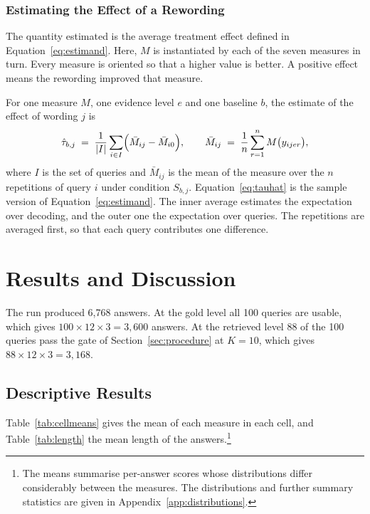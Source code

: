 \documentclass[12pt,a4paper,oneside]{scrreprt}
\begin{document}
\subsection{Estimating the Effect of a Rewording}
\label{sec:analysis}

The quantity estimated is the average treatment effect defined in Equation~\eqref{eq:estimand}. Here, $M$ is instantiated by each of the seven measures in turn. Every measure is oriented so that a higher value is better. A positive effect means the rewording improved that measure.

For one measure $M$, one evidence level $e$ and one baseline $b$, the estimate of the effect of wording $j$ is
\begin{equation}
\label{eq:tauhat}
\hat{\tau}_{b,j} \;=\; \frac{1}{|I|} \sum_{i \in I} \Bigl( \bar{M}_{ij} - \bar{M}_{i0} \Bigr), \qquad \bar{M}_{ij} \;=\; \frac{1}{n} \sum_{r=1}^{n} M\bigl(y_{ijer}\bigr),
\end{equation}
where $I$ is the set of queries and $\bar{M}_{ij}$ is the mean of the measure over the $n$ repetitions of query $i$ under condition $S_{b,j}$. Equation~\eqref{eq:tauhat} is the sample version of Equation~\eqref{eq:estimand}. The inner average estimates the expectation over decoding, and the outer one the expectation over queries. The repetitions are averaged first, so that each query contributes one difference. 


\chapter{Results and Discussion}
\label{ch:results}



The run produced 6,768 answers. At the gold level all 100 queries are usable, which gives $100 \times 12 \times 3 = 3{,}600$ answers. At the retrieved level 88 of the 100 queries pass the gate of Section~\ref{sec:procedure} at $K = 10$, which gives $88 \times 12 \times 3 = 3{,}168$. 

\section{Descriptive Results}
\label{sec:descriptive}

Table~\ref{tab:cellmeans} gives the mean of each measure in each cell, and Table~\ref{tab:length} the mean length of the answers.\footnote{The means summarise per-answer scores whose distributions differ considerably between the measures. The distributions and further summary statistics are given in Appendix~\ref{app:distributions}.}
\end{document}
